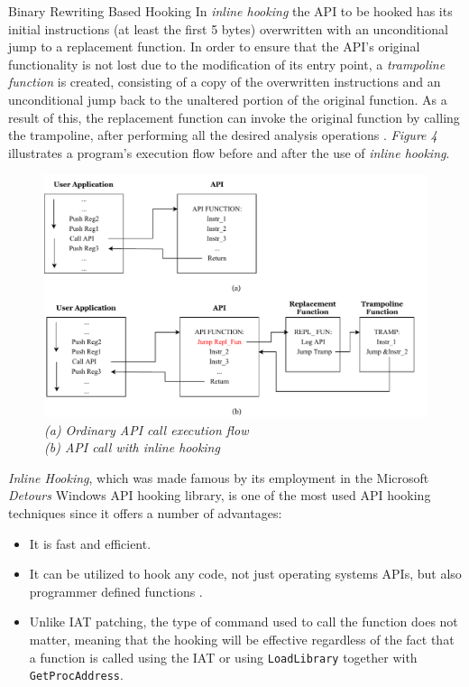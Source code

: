 \documentclass[binding=0.6cm,LaM,english,noexaminfo,oneside]{sapthesis} %
\begin{document}
\begin{section}{Binary Rewriting Based Hooking}
In \textit{inline hooking} the API to be hooked has its initial instructions (at least the first 5 bytes) overwritten with an unconditional jump to a replacement function. In order to ensure that the API's original functionality is not lost due to the modification of its entry point, a \textit{trampoline function} is created, consisting of a copy of the overwritten instructions and an unconditional jump back to the unaltered portion of the original function. As a result of this, the replacement function can invoke the original function by calling the trampoline, after performing all the desired analysis operations \cite{Berdajs:2010:EAU:1815744.1815746}.
\textit{Figure 4} illustrates a program's execution flow before and after the use of \textit{inline hooking}.

\begin{figure}[h]
\centering
\includegraphics[scale=0.8]{Figures/Inline.pdf}
\caption{\textit{(a) Ordinary API call execution flow \\
				  (b) API call with inline hooking}}
\end{figure}

\newpage

\textit{Inline Hooking}, which was made famous by its employment  in the Microsoft \textit{Detours} Windows API hooking library, is one of the most used API hooking techniques since it offers a number of advantages:
\begin{itemize}
\item It is fast and efficient.
\item It can be utilized to hook any code, not just operating systems APIs, but also programmer defined functions \cite{Rootkit}. 
\item Unlike IAT patching, the type of command used to call the function does not matter, meaning that the hooking will be effective regardless of the fact that a function is called using the IAT or using \texttt{LoadLibrary} together with \texttt{GetProcAddress}.
\end{itemize} 


\end{section}
\end{document}
